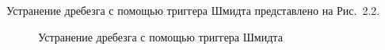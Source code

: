 \documentclass{altsu-report}
\begin{document}
Устранение дребезга с помощью триггера Шмидта представлено на Рис.~2.2.

\begin{figure}[H]
    \begin{minipage}[h]{0.49\linewidth}
    \end{minipage}
    \hfill
    \begin{minipage}[h]{0.49\linewidth}
    \end{minipage}
    \caption{Устранение дребезга с помощью триггера Шмидта}
    \label{fig:image1}
\end{figure}
\end{document}
